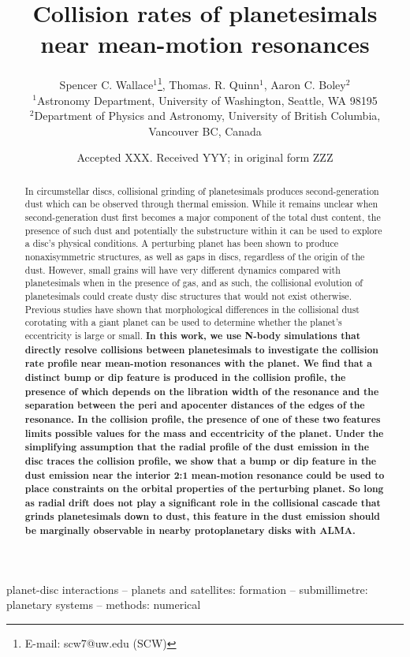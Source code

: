 \documentclass[fleqn,usenatbib]{mnras}
\title[Collision rates of planetesimals]{Collision rates of planetesimals near mean-motion resonances}
\author[S. C. Wallace et al.]{
Spencer C. Wallace$^{1}$\thanks{E-mail: scw7@uw.edu (SCW)},
Thomas. R. Quinn$^{1}$,
Aaron C. Boley$^{2}$
\\
$^{1}$Astronomy Department, University of Washington, Seattle, WA 98195\\
$^{2}$Department of Physics and Astronomy, University of British Columbia, Vancouver BC, Canada
}
\date{Accepted XXX. Received YYY; in original form ZZZ}
\begin{document}
\label{firstpage}
\pagerange{\pageref{firstpage}--\pageref{lastpage}}
\maketitle

\begin{abstract}
In circumstellar discs, collisional grinding of planetesimals produces second-generation dust which can be observed through thermal 
emission. While it remains unclear when second-generation dust first becomes a major component of the total dust content, the presence of 
such dust and potentially the substructure within it can be used to explore a disc's physical conditions. A perturbing planet has been shown to 
produce nonaxisymmetric structures, as well as gaps in discs, regardless of the origin of the dust. However, small grains will have very 
different dynamics compared with planetesimals when in the presence of gas, and as such, the collisional evolution of planetesimals could 
create dusty disc structures that would not exist otherwise. Previous studies have shown that morphological differences in the collisional dust 
corotating with a giant planet can be used to determine whether the planet's eccentricity is large or small. \textbf{In this work, we use N-body simulations
that directly resolve collisions between planetesimals to investigate the collision rate profile near mean-motion resonances with the planet. We 
find that a distinct bump or dip feature is produced in the collision profile, the presence of which depends on the libration width of the resonance and the 
separation between the peri and apocenter distances of the edges of the resonance. In the collision profile, the presence of one of these two features
limits possible values for the mass and eccentricity of the planet. Under the simplifying assumption that the radial profile of the dust emission in the disc
traces the collision profile, we show that a bump or dip feature in the dust emission near the interior 2:1 mean-motion resonance could be used to place constraints
on the orbital properties of the perturbing planet. So long as radial drift does not play a significant role in the collisional cascade that grinds planetesimals down to
dust, this feature in the dust emission should be marginally observable in nearby protoplanetary disks with ALMA.}
\end{abstract}

\begin{keywords}
planet-disc interactions -- planets and satellites: formation -- submillimetre: planetary systems -- methods: numerical
\end{keywords}
\end{document}
